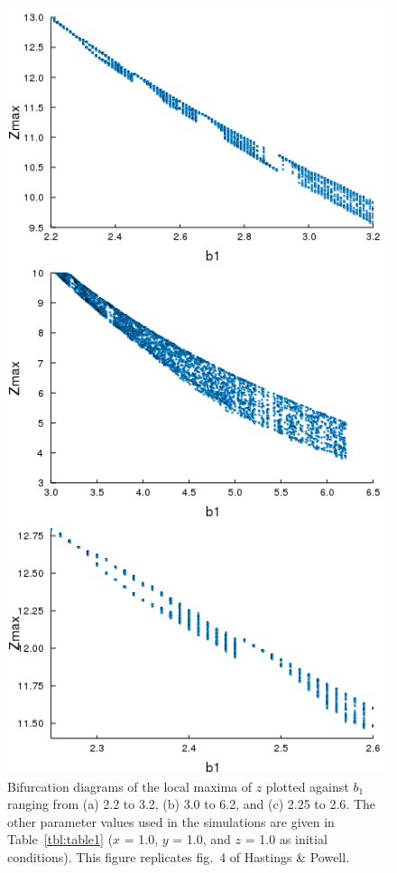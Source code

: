\documentclass[
]{article}
\begin{document}
\begin{figure}
\hypertarget{fig:fig4}{%
\centering
\includegraphics{figures/fig4.png}
\caption{Bifurcation diagrams of the local maxima of \(z\) plotted
against \(b_1\) ranging from (a) 2.2 to 3.2, (b) 3.0 to 6.2, and (c)
2.25 to 2.6. The other parameter values used in the simulations are
given in Table~\ref{tbl:table1} (\(x\) = 1.0, \(y\) = 1.0, and \(z\) =
1.0 as initial conditions). This figure replicates fig.~4 of Hastings \&
Powell.}\label{fig:fig4}
}
\end{figure}
\end{document}
